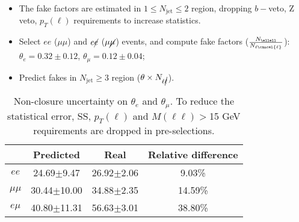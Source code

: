 \begin{itemize}
\item The fake factors are estimated in $1\leq N_{\text{jet}}\leq2$ region, dropping $b-$veto, Z veto, $p_T(\ell)$ requirements to increase statistics.
\item Select $ee$ ($\mu\mu$) and $e\cancel{e}$ ($\mu\cancel{\mu}$) events, and compute fake factors ($\frac{N_{\ellell}}{N_{\ell\cancel{\ell}}}$):\\
  $\theta_{e}=0.32\pm0.12$, $\theta_{\mu}=0.12\pm0.04$;
\item Predict fakes in $N_{\text{jet}} \geq$3 region ($\theta \times N_{\ell\cancel{\ell}}$).
\end{itemize}
\begin{table}[h]
\centering
\begin{tabular}{c|ccc}
   &Predicted  &Real   &Relative difference  \\
\hline
$ee$   &24.69$\pm$9.47  &26.92$\pm$2.06 &9.03\% \\
$\mu\mu$ &30.44$\pm$10.00 &34.88$\pm$2.35 &14.59\% \\
$e\mu$   &40.80$\pm$11.31  &56.63$\pm$3.01  &38.80\% \\
\hline
\end{tabular}
\caption{Non-closure uncertainty on $\theta_{e}$ and $\theta_{\mu}$. To reduce the statistical error, SS, $p_T(\ell)$ and $M(\ell\ell)>$15 GeV requirements are dropped in pre-selections.}
\label{tab:nonclosure_ttbar}
\end{table}
